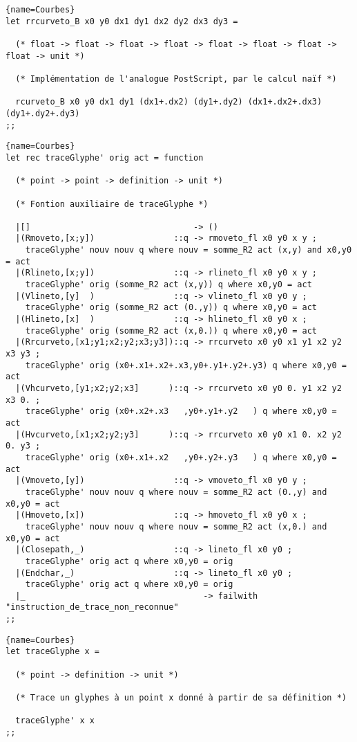\documentclass[10pt,twoside,a4paper]{article}
\begin{document}
\begin{lstlisting}{name=Courbes}
let rrcurveto_B x0 y0 dx1 dy1 dx2 dy2 dx3 dy3 =

  (* float -> float -> float -> float -> float -> float -> float -> float -> unit *)

  (* Implémentation de l'analogue PostScript, par le calcul naïf *)
  
  rcurveto_B x0 y0 dx1 dy1 (dx1+.dx2) (dy1+.dy2) (dx1+.dx2+.dx3) (dy1+.dy2+.dy3)
;;
\end{lstlisting}
\pagebreak
\begin{lstlisting}{name=Courbes}
let rec traceGlyphe' orig act = function

  (* point -> point -> definition -> unit *)

  (* Fontion auxiliaire de traceGlyphe *)

  |[]                                 -> ()
  |(Rmoveto,[x;y])                ::q -> rmoveto_fl x0 y0 x y ;
    traceGlyphe' nouv nouv q where nouv = somme_R2 act (x,y) and x0,y0 = act
  |(Rlineto,[x;y])                ::q -> rlineto_fl x0 y0 x y ;
    traceGlyphe' orig (somme_R2 act (x,y)) q where x0,y0 = act
  |(Vlineto,[y]  )                ::q -> vlineto_fl x0 y0 y ;
    traceGlyphe' orig (somme_R2 act (0.,y)) q where x0,y0 = act
  |(Hlineto,[x]  )                ::q -> hlineto_fl x0 y0 x ;
    traceGlyphe' orig (somme_R2 act (x,0.)) q where x0,y0 = act
  |(Rrcurveto,[x1;y1;x2;y2;x3;y3])::q -> rrcurveto x0 y0 x1 y1 x2 y2 x3 y3 ;
    traceGlyphe' orig (x0+.x1+.x2+.x3,y0+.y1+.y2+.y3) q where x0,y0 = act
  |(Vhcurveto,[y1;x2;y2;x3]      )::q -> rrcurveto x0 y0 0. y1 x2 y2 x3 0. ;
    traceGlyphe' orig (x0+.x2+.x3   ,y0+.y1+.y2   ) q where x0,y0 = act
  |(Hvcurveto,[x1;x2;y2;y3]      )::q -> rrcurveto x0 y0 x1 0. x2 y2 0. y3 ;
    traceGlyphe' orig (x0+.x1+.x2   ,y0+.y2+.y3   ) q where x0,y0 = act
  |(Vmoveto,[y])                  ::q -> vmoveto_fl x0 y0 y ;
    traceGlyphe' nouv nouv q where nouv = somme_R2 act (0.,y) and x0,y0 = act
  |(Hmoveto,[x])                  ::q -> hmoveto_fl x0 y0 x ;
    traceGlyphe' nouv nouv q where nouv = somme_R2 act (x,0.) and x0,y0 = act
  |(Closepath,_)                  ::q -> lineto_fl x0 y0 ;
    traceGlyphe' orig act q where x0,y0 = orig
  |(Endchar,_)                    ::q -> lineto_fl x0 y0 ;
    traceGlyphe' orig act q where x0,y0 = orig
  |_                                    -> failwith "instruction_de_trace_non_reconnue" 
;;
\end{lstlisting}

\begin{lstlisting}{name=Courbes}
let traceGlyphe x =

  (* point -> definition -> unit *)

  (* Trace un glyphes à un point x donné à partir de sa définition *)

  traceGlyphe' x x
;;
\end{lstlisting}
\end{document}
